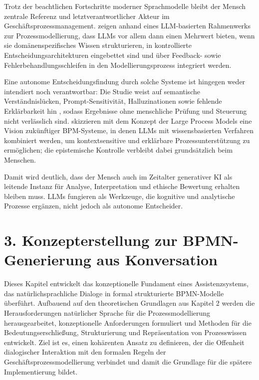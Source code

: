 \documentclass[a4paper,12pt]{scrreprt}
\begin{document}
Trotz der beachtlichen Fortschritte moderner Sprachmodelle bleibt der Mensch zentrale Referenz und letztverantwortlicher Akteur im Geschäftsprozessmanagement. 
\citet[S.~4--9]{Kourani2024} zeigen anhand eines LLM-basierten Rahmenwerks zur Prozessmodellierung, dass \acp{LLM} vor allem dann einen Mehrwert bieten, 
wenn sie domänenspezifisches Wissen strukturieren, in kontrollierte Entscheidungsarchitekturen eingebettet sind und über Feedback- sowie Fehlerbehandlungsschleifen in den Modellierungsprozess integriert werden. 

Eine autonome Entscheidungsfindung durch solche Systeme ist hingegen weder intendiert noch verantwortbar: Die Studie weist auf semantische Verständnislücken, Prompt-Sensitivität, Halluzinationen sowie fehlende Erklärbarkeit hin \citep[S.~11--14]{Kourani2024}, 
sodass Ergebnisse ohne menschliche Prüfung und Steuerung nicht verlässlich sind. 
\citet[S.~81--84]{KampikWarmuthRebmannLeiteKirchner2025} skizzieren mit dem Konzept der Large Process Models eine Vision zukünftiger BPM-Systeme, in denen \acp{LLM} mit wissensbasierten Verfahren kombiniert werden, um kontextsensitive und erklärbare Prozessunterstützung zu ermöglichen; die epistemische Kontrolle verbleibt dabei grundsätzlich beim Menschen.

Damit wird deutlich, dass der Mensch auch im Zeitalter generativer KI als leitende Instanz für Analyse, Interpretation und ethische Bewertung erhalten bleiben muss. 
\acp{LLM} fungieren als Werkzeuge, die kognitive und analytische Prozesse ergänzen, nicht jedoch als autonome Entscheider.



\section*{3. Konzepterstellung zur BPMN-Generierung aus Konversation}

Dieses Kapitel entwickelt das konzeptionelle Fundament eines Assistenzsystems, das natürlichsprachliche Dialoge in formal strukturierte BPMN-Modelle überführt. Aufbauend auf den theoretischen Grundlagen aus Kapitel 2 werden die Herausforderungen natürlicher Sprache für die Prozessmodellierung herausgearbeitet, konzeptionelle Anforderungen formuliert und Methoden für die Bedeutungserschließung, Strukturierung und Repräsentation von Prozesswissen entwickelt. Ziel ist es, einen kohärenten Ansatz zu definieren, der die Offenheit dialogischer Interaktion mit den formalen Regeln der Geschäftsprozessmodellierung verbindet und damit die Grundlage für die spätere Implementierung bildet.
\end{document}
